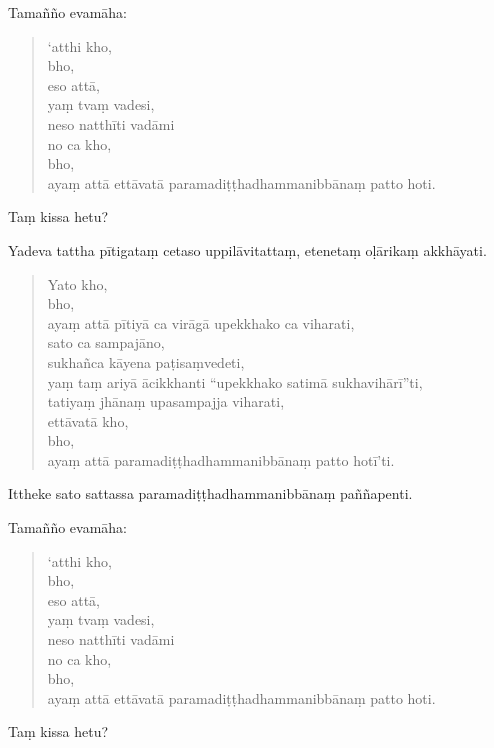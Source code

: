 \documentclass[11pt,twoside,openright]{book}
\begin{document}
\pstart
Tamañño evamāha:
\pend

\begin{verse}
‘atthi kho,\\
\vin  bho,\\
\vin  eso attā,\\
\vin  yaṃ tvaṃ vadesi,\\
\vin  neso natthīti vadāmi\\


no ca kho,\\
\vin  bho,\\
\vin  ayaṃ attā ettāvatā paramadiṭṭhadhammanibbānaṃ patto hoti.

\end{verse}
\pstart
Taṃ kissa hetu?
\pend

\pstart
Yadeva tattha pītigataṃ cetaso uppilāvitattaṃ, etenetaṃ oḷārikaṃ akkhāyati.
\pend

\begin{verse}
Yato kho,\\
\vin  bho,\\
\vin  ayaṃ attā pītiyā ca virāgā upekkhako ca viharati,\\
\vin  sato ca sampajāno,\\
\vin  sukhañca kāyena paṭisaṃvedeti,\\
\vin  yaṃ taṃ ariyā ācikkhanti “upekkhako satimā sukhavihārī”ti,\\
\vin  tatiyaṃ jhānaṃ upasampajja viharati,\\
\vin  ettāvatā kho,\\
\vin  bho,\\
\vin  ayaṃ attā paramadiṭṭhadhammanibbānaṃ patto hotī’ti.

\end{verse}
\pstart
Ittheke sato sattassa paramadiṭṭhadhammanibbānaṃ paññapenti.
\pend

\pstart
Tamañño evamāha:
\pend

\begin{verse}
‘atthi kho,\\
\vin  bho,\\
\vin  eso attā,\\
\vin  yaṃ tvaṃ vadesi,\\
\vin  neso natthīti vadāmi\\


no ca kho,\\
\vin  bho,\\
\vin  ayaṃ attā ettāvatā paramadiṭṭhadhammanibbānaṃ patto hoti.

\end{verse}
\pstart
Taṃ kissa hetu?
\pend
\end{document}
